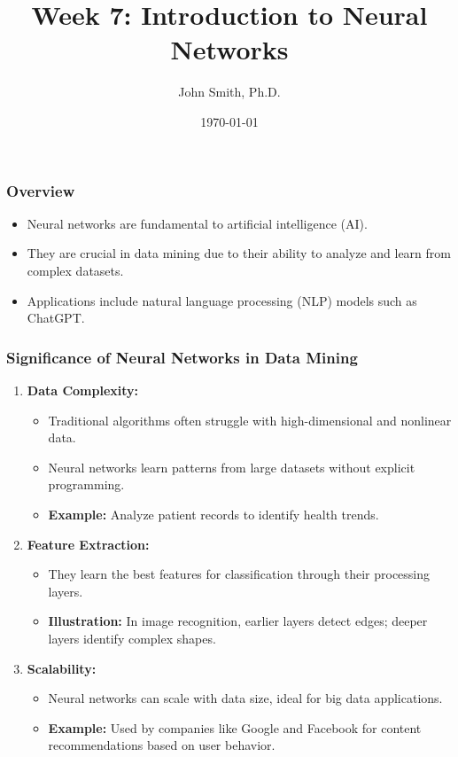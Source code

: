 \documentclass[aspectratio=169]{beamer}
\title[Week 7: Introduction to Neural Networks]{Week 7: Introduction to Neural Networks}
\author[J. Smith]{John Smith, Ph.D.}
\institute[University Name]{
  Department of Computer Science\\
  University Name\\
}
\date{\today}
\begin{document}
\frame{\titlepage}

\begin{frame}[fragile]
    \titlepage
\end{frame}

\begin{frame}[fragile]
    \frametitle{Overview}
    
    \begin{itemize}
        \item Neural networks are fundamental to artificial intelligence (AI).
        \item They are crucial in data mining due to their ability to analyze and learn from complex datasets.
        \item Applications include natural language processing (NLP) models such as ChatGPT.
    \end{itemize}
\end{frame}

\begin{frame}[fragile]
    \frametitle{Significance of Neural Networks in Data Mining}
    
    \begin{enumerate}
        \item \textbf{Data Complexity:}
        \begin{itemize}
            \item Traditional algorithms often struggle with high-dimensional and nonlinear data.
            \item Neural networks learn patterns from large datasets without explicit programming.
            \item \textbf{Example:} Analyze patient records to identify health trends.
        \end{itemize}
        
        \item \textbf{Feature Extraction:}
        \begin{itemize}
            \item They learn the best features for classification through their processing layers.
            \item \textbf{Illustration:} In image recognition, earlier layers detect edges; deeper layers identify complex shapes.
        \end{itemize}
        
        \item \textbf{Scalability:}
        \begin{itemize}
            \item Neural networks can scale with data size, ideal for big data applications.
            \item \textbf{Example:} Used by companies like Google and Facebook for content recommendations based on user behavior.
        \end{itemize}
    \end{enumerate}
\end{frame}
\end{document}
